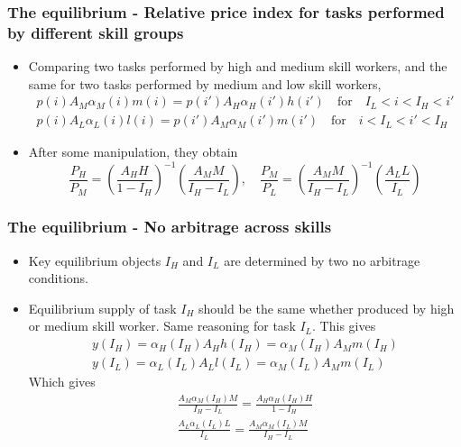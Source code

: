 \documentclass[mathserif]{beamer}
\begin{document}
\begin{frame}
\frametitle{The equilibrium - Relative price index for tasks performed by different skill groups}
\begin{itemize}
\item Comparing two tasks performed by high and medium skill workers, and the same for two tasks performed by medium and low skill workers,
\begin{multline*}
p(i)A_M\alpha_M(i)m(i)=p(i')A_H\alpha_H(i')h(i') \quad \text{for} \quad I_L<i<I_H<i'
\\ p(i)A_L\alpha_L(i)l(i)=p(i')A_M\alpha_M(i')m(i') \quad \text{for} \quad i<I_L<i'<I_H
\end{multline*}
\item After some manipulation, they obtain
\begin{equation*}
\frac{P_H}{P_M}=(\frac{A_HH}{1-I_H})^{-1}(\frac{A_MM}{I_H-I_L}), \quad
\frac{P_M}{P_L}=(\frac{A_MM}{I_H-I_L})^{-1}(\frac{A_LL}{I_L})
\end{equation*}
\end{itemize}
\end{frame}
\begin{frame}
\frametitle{The equilibrium - No arbitrage across skills}
\begin{itemize}
\item Key equilibrium objects $I_H$ and $I_L$ are determined by two no arbitrage conditions.
\item  Equilibrium supply of task $I_H$ should be the same whether produced by high or medium skill worker. Same reasoning for task $I_L$. This gives
\begin{multline*}
y(I_H)=\alpha_H(I_H)A_Hh(I_H)=\alpha_M(I_H)A_Mm(I_H)
\\ y(I_L)=\alpha_L(I_L)A_Ll(I_L)=\alpha_M(I_L)A_Mm(I_L)
\end{multline*}
Which gives
\begin{multline*}
\frac{A_M\alpha_M(I_H)M}{I_H-I_L}=\frac{A_H\alpha_H(I_H)H}{1-I_H}
\\ \frac{A_L\alpha_L(I_L)L}{I_L}=\frac{A_M\alpha_M(I_L)M}{I_H-I_L}
\end{multline*}
\end{itemize}
\end{frame}
\end{document}
